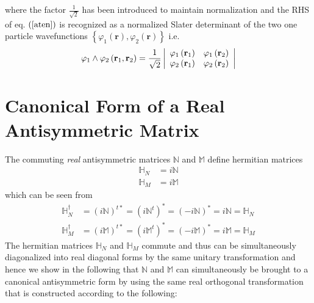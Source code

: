 \documentclass[aps,preprint]{revtex4}%
\begin{document}
where the factor $\frac{1}{\sqrt{2}}$ has been introduced to maintain
normalization and the RHS of eq. $\left(  \ref{aten}\right)  $ is recognized
as a normalized Slater determinant of the two one particle wavefunctions
$\left\{  \varphi_{1}\left(  \mathbf{r}\right)  ,\varphi_{2}\left(
\mathbf{r}\right)  \right\}  $ i.e.%
\begin{equation}
\varphi_{1}\wedge\varphi_{2}\left(  \mathbf{r}_{1},\mathbf{r}_{2}\right)
=\frac{1}{\sqrt{2}}\left\vert
\begin{array}
[c]{cc}%
\varphi_{1}\left(  \mathbf{r}_{1}\right)  & \varphi_{1}\left(  \mathbf{r}%
_{2}\right) \\
\varphi_{2}\left(  \mathbf{r}_{1}\right)  & \varphi_{2}\left(  \mathbf{r}%
_{2}\right)
\end{array}
\right\vert
\end{equation}


\section{Canonical Form of a Real Antisymmetric Matrix\label{realanti}}

The commuting \emph{real }antisymmetric\emph{ }matrices\emph{ }$\mathbb{N}$
and $\mathbb{M}$ define hermitian matrices
\begin{align}
\mathbb{H}_{N}  &  =i\mathbb{N}\nonumber\\
\mathbb{H}_{M}  &  =i\mathbb{M}%
\end{align}
which can be seen from
\begin{align}
\mathbb{H}_{N}^{\dagger}  &  =\left(  i\mathbb{N}\right)  ^{t\ast}=\left(
i\mathbb{N}^{t}\right)  ^{\ast}=\left(  -i\mathbb{N}\right)  ^{\ast
}=i\mathbb{N=H}_{N}\nonumber\\
\mathbb{H}_{M}^{\dagger}  &  =\left(  i\mathbb{M}\right)  ^{t\ast}=\left(
i\mathbb{M}^{t}\right)  ^{\ast}=\left(  -i\mathbb{M}\right)  ^{\ast
}=i\mathbb{M=H}_{M}%
\end{align}
The hermitian matrices $\mathbb{H}_{N}$ and $\mathbb{H}_{M}$ commute and thus
can be simultaneously diagonalized into real diagonal forms by the same
unitary transformation and hence we show in the following that $\mathbb{N}$
and $\mathbb{M}$ can simultaneously be brought to a canonical antisymmetric
form by using the same real orthogonal transformation that is constructed
according to the following:
\end{document}
